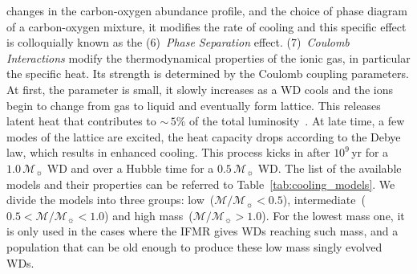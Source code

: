 \documentclass[fleqn,usenatbib]{rasti}
\newcommand{\msun}{\mathcal{M}_{\sun}}
\begin{document}
changes in the carbon-oxygen abundance profile, and the choice of phase
diagram of a carbon-oxygen mixture, it modifies the rate of cooling and this
specific effect is colloquially known as the (6)~\textit{Phase Separation}
effect. (7)~\textit{Coulomb Interactions} modify the thermodynamical
properties of the ionic gas, in particular the specific heat. Its strength is
determined by the Coulomb coupling parameters. At first, the parameter is
small, it slowly increases as a WD cools and the ions begin to change from
gas to liquid and eventually form lattice. This releases latent heat that
contributes to $\sim$\,$5\%$ of the total luminosity~\citep{1976A&A....51..383S}.
At late time, a few modes of the lattice are excited, the heat capacity drops
according to the Debye law, which results in enhanced cooling. This process
kicks in after $10^9$\,yr for a $1.0\,\msun$ WD and over a Hubble time for a
$0.5\,\msun$ WD. The list of the available models and their properties can be
referred to Table~\ref{tab:cooling_models}. We divide the models into three
groups: low~($\mathcal{M}/\msun < 0.5$),
intermediate~($0.5 < \mathcal{M}/\msun < 1.0$) and
high mass~($\mathcal{M}/\msun > 1.0$). For the lowest mass one, it is only
used in the cases where the IFMR gives WDs reaching such mass, and a
population that can be old enough to produce these low mass singly evolved
WDs.
\end{document}
